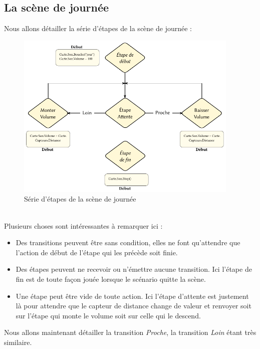 \newpage
\subsection{La scène de journée}
Nous allons détailler la série d'étapes de la scène de journée :
\begin{figure}[htbp]
  \centering
  \includegraphics[width=0.95\textwidth]{figs/etapes_poubelle_jour.pdf}
  \caption{Série d'étapes de la scène de journée}
  \label{fig:ex_poubelle_etapes_jour}
\end{figure} ~\\
Plusieurs choses sont intéressantes à remarquer ici : 
\begin{itemize}
\item Des transitions peuvent être sans condition, elles ne font qu'attendre que l'action de début de l'étape qui les précède soit finie.
\item Des étapes peuvent ne recevoir ou n'émettre aucune transition. Ici l'étape de fin est de toute façon jouée lorsque le scénario quitte la scène.
\item Une étape peut être vide de toute action. Ici l'étape d'attente est justement là pour attendre que le capteur de distance change de valeur et renvoyer soit sur l'étape qui monte le volume soit sur celle qui le descend. 
\end{itemize}\p
Nous allons maintenant détailler la transition \textit{Proche}, la transition \textit{Loin} étant très similaire.\newpage
